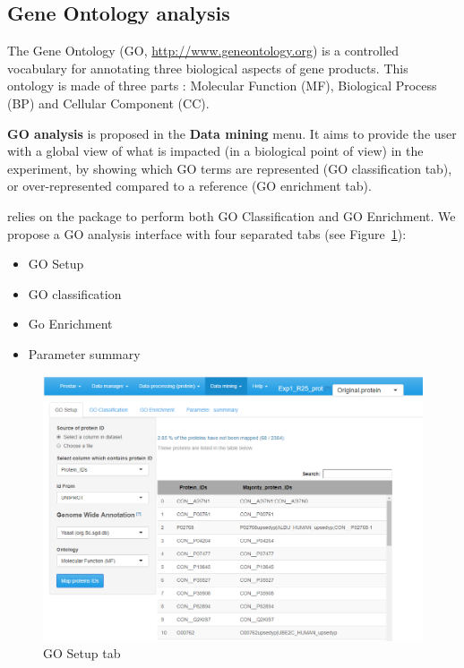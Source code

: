 \documentclass[12pt]{article}
\begin{document}
\subsection{Gene Ontology analysis}\label{sec:GOAnalysis}

The Gene Ontology (GO, \url{http://www.geneontology.org}) is a controlled vocabulary for
annotating three biological aspects of gene products. This ontology is made of three 
parts : Molecular Function (MF), Biological Process (BP) and Cellular Component 
(CC). 

\textbf{GO analysis} is proposed in the \textbf{Data 
mining} menu. It aims to provide the user with a global view of what is 
impacted (in a biological point of view) in the experiment, by showing which
GO terms are represented (GO classification tab), or over-represented compared 
to a reference (GO enrichment tab). 

 relies on the package  to perform both GO 
Classification and GO Enrichment. We propose a GO analysis interface with
four separated tabs (see Figure~\ref{fig:GO_tab1}): 
    \begin{itemize}
\item GO Setup 
\item GO classification
\item Go Enrichment
\item Parameter summary
\end{itemize}

\begin {figure}

\includegraphics[width=\textwidth]{images/GO_tab1.png}
\caption{GO Setup tab}\label{fig:GO_tab1}
\end {figure}
\end{document}
